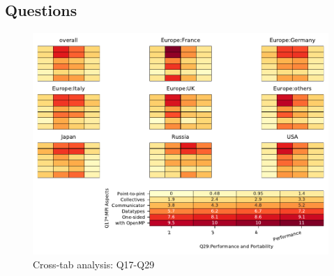 
\subsection{Questions}


\begin{figure}
\begin{center}
\includegraphics[width=12cm]{../pdfs/Q17-Q29.pdf}
\caption{Cross-tab analysis: Q17-Q29}
\label{fig:Q17-Q29}
\end{center}
\end{figure}
